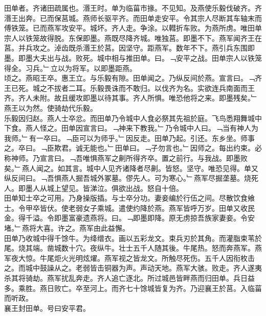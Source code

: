 \documentclass{zhvt-classic}
\begin{document}

\hspace*{2em}田单者。齐诸田疏属也。湣王时。单为临菑市掾。不见知。及燕使乐毅伐破齐。齐湣王出奔。已而保莒城。燕师长驱平齐。而田单走安平。令其宗人尽断其车轴末而傅铁笼。已而燕军攻安平。城坏。齐人走。争涂。以轊折车败。为燕所虏。唯田单宗人以铁笼故得脱。东保即墨。燕既尽降齐城。唯独莒。即墨不下。燕军闻齐王在莒。并兵攻之。淖齿既杀湣王於莒。因坚守。距燕军。数年不下。燕引兵东围即墨。即墨大夫出与战。败死。城中相与推田单。曰。﹁安平之战。田单宗人以铁笼得全。习兵。﹂立以为将军。以即墨距燕。\\
\hspace*{2em}顷之。燕昭王卒。惠王立。与乐毅有隙。田单闻之。乃纵反间於燕。宣言曰。﹁齐王已死。城之不拔者二耳。乐毅畏诛而不敢归。以伐齐为名。实欲连兵南面而王齐。齐人未附。故且缓攻即墨以待其事。齐人所惧。唯恐他将之来。即墨残矣。﹂燕王以为然。使骑劫代乐毅。\\
\hspace*{2em}乐毅因归赵。燕人士卒忿。而田单乃令城中人食必祭其先祖於庭。飞鸟悉翔舞城中下食。燕人怪之。田单因宣言曰。﹁神来下教我。﹂乃令城中人曰。﹁当有神人为我师。﹂有一卒曰。﹁臣可以为师乎。﹂因反走。田单乃起。引还。东乡坐。师事之。卒曰。﹁臣欺君。诚无能也。﹂田单曰。﹁子勿言也。﹂因师之。每出约束。必称神师。乃宣言曰。﹁吾唯惧燕军之劓所得齐卒。置之前行。与我战。即墨败矣。﹂燕人闻之。如其言。城中人见齐诸降者尽劓。皆怒。坚守。唯恐见得。单又纵反间曰。﹁吾惧燕人掘吾城外冢墓。僇先人。可为寒心。﹂燕军尽掘垄墓。烧死人。即墨人从城上望见。皆涕泣。俱欲出战。怒自十倍。\\
\hspace*{2em}田单知士卒之可用。乃身操版插。与士卒分功。妻妾编於行伍之间。尽散饮食飨士。令甲卒皆伏。使老弱女子乘城。遣使约降於燕。燕军皆呼万岁。田单又收民金。得千溢。令即墨富豪遗燕将。曰。﹁即墨即降。原无虏掠吾族家妻妾。令安堵。﹂燕将大喜。许之。燕军由此益懈。\\
\hspace*{2em}田单乃收城中得千馀牛。为绛缯衣。画以五彩龙文。束兵刃於其角。而灌脂束苇於尾。烧其端。凿城数十穴。夜纵牛。壮士五千人随其後。牛尾热。怒而奔燕军。燕军夜大惊。牛尾炬火光明炫燿。燕军视之皆龙文。所触尽死伤。五千人因衔枚击之。而城中鼓譟从之。老弱皆击铜器为声。声动天地。燕军大骇。败走。齐人遂夷杀其将骑劫。燕军扰乱奔走。齐人追亡逐北。所过城邑皆畔燕而归田单。兵日益多。乘胜。燕日败亡。卒至河上。而齐七十馀城皆复为齐。乃迎襄王於莒。入临菑而听政。\\
\hspace*{2em}襄王封田单。号曰安平君。\\
\end{document}
